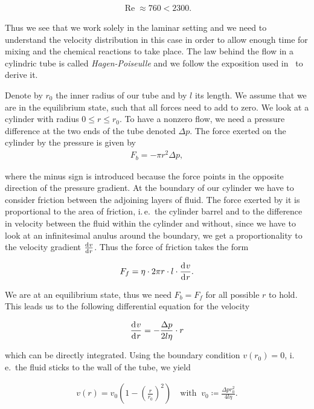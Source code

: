 \begin{align*}
  \operatorname{Re} \approx 760 < 2300.
\end{align*}

Thus we see that we work solely in the laminar setting and we need to
understand the velocity distribution in this case in order to allow
enough time for mixing and the chemical reactions to take place. The
law behind the flow in a cylindric tube is called
\emph{Hagen-Poiseulle} and we follow the exposition used
in~\cite{gerthsen} to derive it.

Denote by $r_0$ the inner radius of our tube and by $l$ its length. We
assume that we are in the equilibrium state, such that all forces need
to add to zero. We look at a cylinder with radius $0 \leq r \leq
r_0$. To have a nonzero flow, we need a pressure difference at the two
ends of the tube denoted $\Delta p$. The force exerted on the cylinder
by the pressure is given by
\begin{align*}
  F_b = - \pi r^2 \Delta p,
\end{align*}

where the minus sign is introduced because the force points in the
opposite direction of the pressure gradient. At the boundary of our
cylinder we have to consider friction between the adjoining layers of
fluid. The force exerted by it is proportional to the area of
friction, i.\,e.\ the cylinder barrel and to the difference in velocity
between the fluid within the cylinder and without, since we have to
look at an infinitesimal anulus around the boundary, we get a
proportionality to the velocity gradient $\frac{\d[v]}{\d[r]}$. Thus
the force of friction takes the form

\begin{align*}
  F_f = \eta \cdot 2\pi r \cdot l \cdot \frac{\d[v]}{\d[r]}.
\end{align*}

We are at an equilibrium state, thus we need $F_b = F_f$ for all
possible $r$ to hold. This leads us to the following differential
equation for the velocity

\begin{align*}
  \frac{\d[v]}{\d[r]} = - \frac{\Delta p}{2l\eta} \cdot r
\end{align*}
 
which can be directly integrated. Using the boundary condition $v(r_0)
= 0$, i.\,e.\ the fluid sticks to the wall of the tube, we yield

\begin{align}
  v(r) = v_0 \left ( 1 - \left( \frac{r}{r_0} \right)^2 \right) \quad
  \text{with }\ v_0 \coloneqq \frac{\Delta p r_0^2}{4 l \eta}. \label{eq:v}
\end{align}

